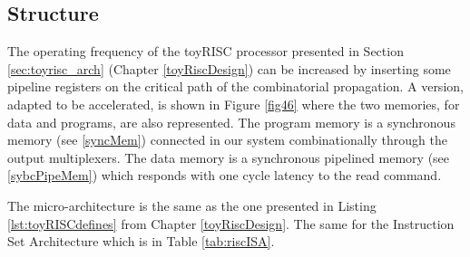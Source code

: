 \subsection{Structure}

The operating frequency of the toyRISC processor presented in Section \ref{sec:toyrisc_arch} (Chapter \ref{toyRiscDesign}) can be increased by inserting some pipeline registers on the critical path of the combinatorial propagation. A version, adapted to be accelerated, is shown in Figure \ref{fig46} where the two memories, for data and programs, are also represented. The program memory is a synchronous memory (see \ref{syncMem}) connected in our system  combinationally  through the output multiplexers. The data memory is a synchronous pipelined memory (see \ref{sybcPipeMem}) which responds with one cycle latency to the read command.

The micro-architecture is the same as the one presented in Listing \ref{lst:toyRISCdefines} from Chapter \ref{toyRiscDesign}. The same for the Instruction Set Architecture which is in Table \ref{tab:riscISA}.


